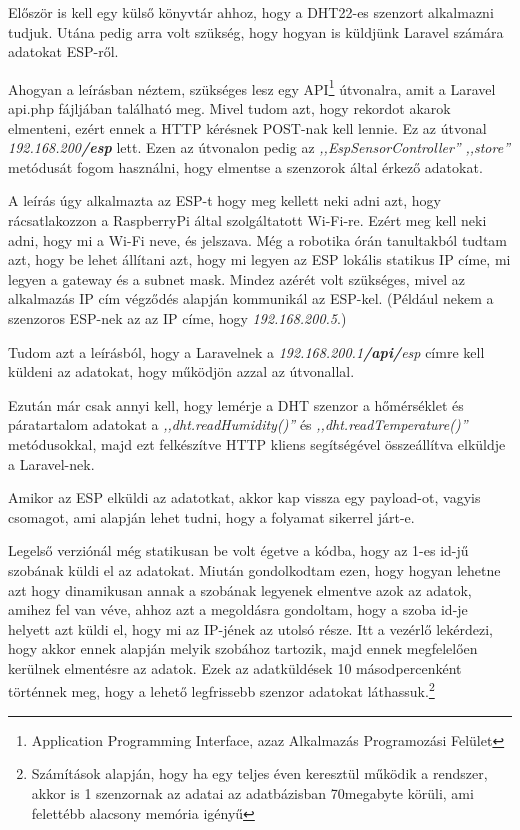 \documentclass[
]{thesis-ekf}
\theoremstyle{definition}
\theoremstyle{remark}
\begin{document}
	Először is kell egy külső könyvtár ahhoz, hogy a DHT22-es szenzort alkalmazni tudjuk.\cite{adafruit-dht-library} Utána pedig arra volt szükség, hogy hogyan is küldjünk Laravel számára adatokat ESP-ről.\cite{arduino-to-laravel}
	
	Ahogyan a leírásban néztem, szükséges lesz egy API\footnote{Application Programming Interface, azaz Alkalmazás Programozási Felület} útvonalra, amit a Laravel api.php fájljában található meg. Mivel tudom azt, hogy rekordot akarok elmenteni, ezért ennek a HTTP kérésnek POST-nak kell lennie. Ez az útvonal \emph{192.168.200\textbf{/esp}} lett. Ezen az útvonalon pedig az \emph{,,EspSensorController''} \emph{,,store''} metódusát fogom használni, hogy elmentse a szenzorok által érkező adatokat. 
	
	A leírás úgy alkalmazta az ESP-t hogy meg kellett neki adni azt, hogy rácsatlakozzon a RaspberryPi által szolgáltatott Wi-Fi-re. Ezért meg kell neki adni, hogy mi a Wi-Fi neve, és jelszava. Még a robotika órán tanultakból tudtam azt, hogy be lehet állítani azt, hogy mi legyen az ESP lokális statikus IP címe, mi legyen a gateway és a subnet mask. Mindez azérét volt szükséges, mivel az alkalmazás IP cím végződés alapján kommunikál az ESP-kel. (Például nekem a szenzoros ESP-nek az az IP címe, hogy \emph{192.168.200.5}.)
	
	Tudom azt a leírásból, hogy a Laravelnek a \emph{192.168.200.1\textbf{/api/}esp} címre kell küldeni az adatokat, hogy működjön azzal az útvonallal. 
	
	Ezután már csak annyi kell, hogy lemérje a DHT szenzor a hőmérséklet és páratartalom adatokat a \emph{,,dht.readHumidity()''} és \emph{,,dht.readTemperature()''} metódusokkal, majd ezt felkészítve HTTP kliens segítségével összeállítva elküldje a Laravel-nek.
	
	Amikor az ESP elküldi az adatotkat, akkor kap vissza egy payload-ot, vagyis csomagot, ami alapján lehet tudni, hogy a folyamat sikerrel járt-e.
	
	Legelső verziónál még statikusan be volt égetve a kódba, hogy az 1-es id-jű szobának küldi el az adatokat. Miután gondolkodtam ezen, hogy hogyan lehetne azt hogy dinamikusan annak a szobának legyenek elmentve azok az adatok, amihez fel van véve, ahhoz azt a megoldásra gondoltam, hogy a szoba id-je helyett azt küldi el, hogy mi az IP-jének az utolsó része. Itt a vezérlő lekérdezi, hogy akkor ennek alapján melyik szobához tartozik, majd ennek megfelelően kerülnek elmentésre az adatok. Ezek az adatküldések 10 másodpercenként történnek meg, hogy a lehető legfrissebb szenzor adatokat láthassuk.\footnote{Számítások alapján, hogy ha egy teljes éven keresztül működik a rendszer, akkor is 1 szenzornak az adatai az adatbázisban 70megabyte körüli, ami felettébb alacsony memória igényű}
	
\end{document}
